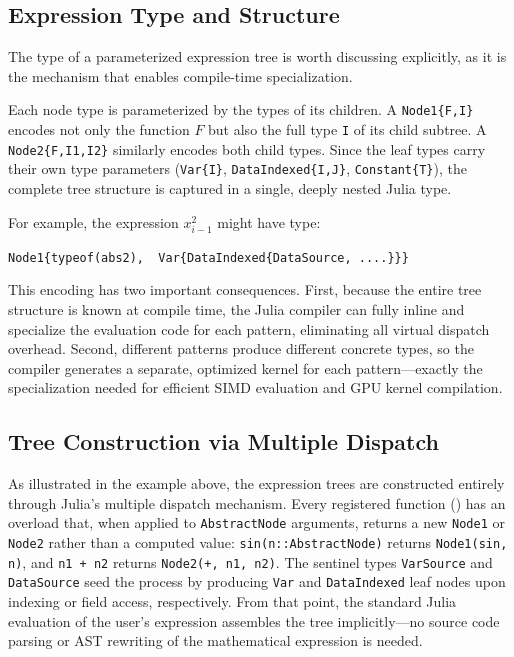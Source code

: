 \documentclass[11pt]{article}
\begin{document}
\subsection{Expression Type and Structure}
\label{sec:graph:type}

The type of a parameterized expression tree is worth discussing explicitly, as it is the mechanism that enables compile-time specialization.

Each node type is parameterized by the types of its children. A \texttt{Node1\{F,I\}} encodes not only the function $F$ but also the full type \texttt{I} of its child subtree. A \texttt{Node2\{F,I1,I2\}} similarly encodes both child types. Since the leaf types carry their own type parameters (\texttt{Var\{I\}}, \texttt{DataIndexed\{I,J\}}, \texttt{Constant\{T\}}), the complete tree structure is captured in a single, deeply nested Julia type.

For example, the expression $x_{i-1}^2$ might have type:
\begin{center}
\texttt{Node1\{typeof(abs2),\, Var\{DataIndexed\{DataSource, ....\}\}\}}
\end{center}
This encoding has two important consequences. First, because the entire tree structure is known at compile time, the Julia compiler can fully inline and specialize the evaluation code for each pattern, eliminating all virtual dispatch overhead. Second, different patterns produce different concrete types, so the compiler generates a separate, optimized kernel for each pattern---exactly the specialization needed for efficient SIMD evaluation and GPU kernel compilation.

\subsection{Tree Construction via Multiple Dispatch}
\label{sec:graph:construction}

As illustrated in the example above, the expression trees are constructed entirely through Julia's multiple dispatch mechanism. Every registered function () has an overload that, when applied to \texttt{AbstractNode} arguments, returns a new \texttt{Node1} or \texttt{Node2} rather than a computed value: \texttt{sin(n::AbstractNode)} returns \texttt{Node1(sin, n)}, and \texttt{n1 + n2} returns \texttt{Node2(+, n1, n2)}. The sentinel types \texttt{VarSource} and \texttt{DataSource} seed the process by producing \texttt{Var} and \texttt{DataIndexed} leaf nodes upon indexing or field access, respectively. From that point, the standard Julia evaluation of the user's expression assembles the tree implicitly---no source code parsing or AST rewriting of the mathematical expression is needed.
\end{document}
